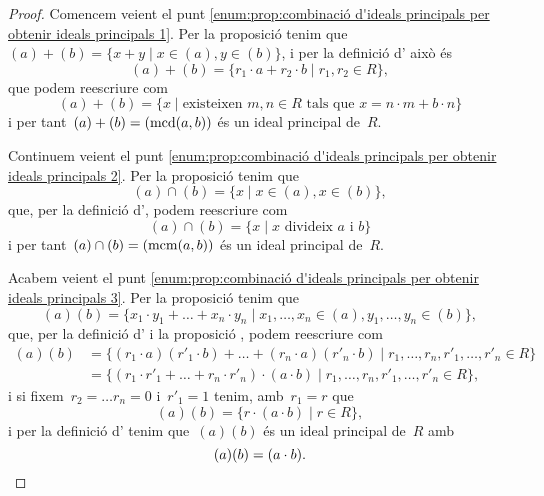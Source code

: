 \documentclass[../../main.tex]{subfiles}
\begin{document}
    \begin{proof}%
        Comencem veient el punt \eqref{enum:prop:combinació d'ideals principals per obtenir ideals principals 1}.
        Per la proposició  tenim que~\((a)+(b)=\{x+y\mid x\in(a),y\in(b)\}\), i per la definició d' això és
        \[
            (a)+(b)=\{r_{1}\cdot a+r_{2}\cdot b\mid r_{1},r_{2}\in R\},
        \]
        que podem reescriure com
        \[
            (a)+(b)=\{x\mid\text{existeixen }m,n\in R\text{ tals que }x=n\cdot m+b\cdot n\}
        \]
        i per tant~\((a)+(b)=(\operatorname{mcd}(a,b))\) és un ideal principal de~\(R\).

        Continuem veient el punt \eqref{enum:prop:combinació d'ideals principals per obtenir ideals principals 2}.
        Per la proposició  tenim que
        \[
            (a)\cap(b)=\{x\mid x\in(a),x\in(b)\},
        \]
        que, per la definició d', podem reescriure com
        \[
            (a)\cap(b)=\{x\mid x\text{ divideix }a\text{ i }b\}
        \]
        i per tant~\((a)\cap(b)=(\operatorname{mcm}(a,b))\) és un ideal principal de~\(R\).

        Acabem veient el punt \eqref{enum:prop:combinació d'ideals principals per obtenir ideals principals 3}.
        Per la proposició  tenim que
        \[
            (a)(b)=\{x_{1}\cdot y_{1}+\dots+x_{n}\cdot y_{n}\mid x_{1},\dots,x_{n}\in(a),y_{1},\dots,y_{n}\in(b)\},
        \]
        que, per la definició d' i la proposició , podem reescriure com
        \begin{align*}
        (a)(b)&=\{(r_{1}\cdot a)(r'_{1}\cdot b)+\dots+(r_{n}\cdot a)(r'_{n}\cdot b)\mid r_{1},\dots,r_{n},r'_{1},\dots,r'_{n}\in R\}\\
        &=\{(r_{1}\cdot r'_{1}+\dots+r_{n}\cdot r'_{n})\cdot(a\cdot b)\mid r_{1},\dots,r_{n},r'_{1},\dots,r'_{n}\in R\},
        \end{align*}
        i si fixem~\(r_{2}=\dots r_{n}=0\) i~\(r'_{1}=1\) tenim, amb~\(r_{1}=r\) que
        \[
            (a)(b)=\{r\cdot(a\cdot b)\mid r\in R\},
        \]
        i per la definició d' tenim que~\((a)(b)\) és un ideal principal de~\(R\) amb
        \[
            (a)(b)=(a\cdot b).\qedhere
        \]
    \end{proof}
\end{document}
